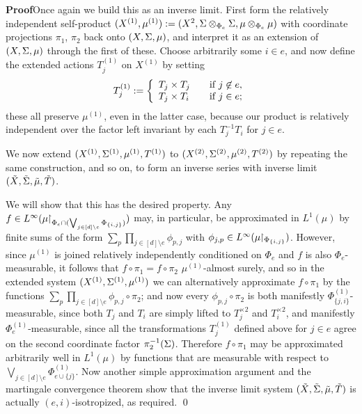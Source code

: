 \documentclass[12pt]{article}
\begin{document}
\textbf{Proof}\quad Once again we build this as an inverse limit.
First form the relatively independent self-product
$(X^{(1)},\mu^{(1)}):=(X^2,\S\otimes_{\Phi_e}\S,\mu\otimes_{\Phi_e}\mu)$
with coordinate projections $\pi_1$, $\pi_2$ back onto $(X,\S,\mu)$,
and interpret it as an extension of $(X,\S,\mu)$ through the first
of these.  Choose arbitrarily some $i \in e$, and now define the
extended actions $T^{(1)}_j$ on $X^{(1)}$ by setting \[T^{(1)}_j
:=\left\{\begin{array}{ll}T_j\times T_j&\quad\hbox{if}\ j\not\in e,\\
T_j\times T_i&\quad\hbox{if}\ j\in e;\end{array}\right.\] these all
preserve $\mu^{(1)}$, even in the latter case, because our product
is relatively independent over the factor left invariant by each
$T_j^{-1}T_i$ for $j \in e$.

We now extend $(X^{(1)},\S^{(1)},\mu^{(1)},T^{(1)})$ to
$(X^{(2)},\S^{(2)},\mu^{(2)},T^{(2)})$ by repeating the same
construction, and so on, to form an inverse series with inverse
limit $(\tilde{X},\tilde{\S},\tilde{\mu},\tilde{T})$.

We will show that this has the desired property. Any $f \in
{L^\infty(\mu\uhr_{\Phi_e\cap (\bigvee_{j\in[d]\setminus
e}\Phi_{\{i,j\}})})}$ may, in particular, be approximated in
$L^1(\mu)$ by finite sums of the form $\sum_p\prod_{j\in[d]\setminus
e}\phi_{p,j}$ with $\phi_{j,p} \in
L^\infty(\mu\uhr_{\Phi_{\{i,j\}}})$.  However, since $\mu^{(1)}$ is
joined relatively independently conditioned on $\Phi_e$ and $f$ is
also $\Phi_e$-measurable, it follows that $f\circ\pi_1=f\circ\pi_2$
$\mu^{(1)}$-almost surely, and so in the extended system
$(X^{(1)},\S^{(1)},\mu^{(1)})$ we can alternatively approximate
$f\circ\pi_1$ by the functions $\sum_p\prod_{j\in[d]\setminus
e}\phi_{p,j}\circ\pi_2$; and now every $\phi_{p,j}\circ\pi_2$ is
both manifestly $\Phi^{(1)}_{\{j,i\}}$-measurable, since both $T_j$
and $T_i$ are simply lifted to $T_j^{\times 2}$ and $T_i^{\times
2}$, and manifestly $\Phi^{(1)}_e$-measurable, since all the
transformations $T^{(1)}_j$ defined above for $j\in e$ agree on the
second coordinate factor $\pi_2^{-1}(\S)$. Therefore $f\circ\pi_1$
may be approximated arbitrarily well in $L^1(\mu)$ by functions that
are measurable with respect to $\bigvee_{j\in[d]\setminus
e}\Phi^{(1)}_{e\cup\{j\}}$. Now another simple approximation
argument and the martingale convergence theorem show that the
inverse limit system $(\tilde{X},\tilde{\S},\tilde{\mu},\tilde{T})$
is actually $(e,i)$-isotropized, as required. \qed
\end{document}
